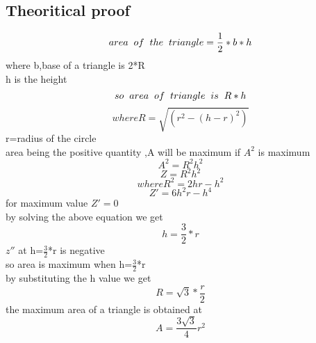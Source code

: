 \documentclass[10pt,a4paper]{report}
\begin{document}
\begin{multicols}{2}
    \section{Theoritical proof}
    \begin{equation}
	    area\hspace{2mm} of\hspace{2mm} the\hspace{2mm} triangle=\frac{1}{2}*b*h
\end{equation}
    where b,base of a triangle is 2*R\\
    h is the height\\
    \begin{equation}
    so \hspace{2mm}area \hspace{2mm}of \hspace{2mm}triangle \hspace{2mm}is \hspace{2mm}R*h
	    \end{equation}
	    \begin{equation}
where R=\sqrt{(r^2-(h-r)^2)}
\end{equation}
r=radius of the circle\\
area being the positive quantity ,A will be maximum if $A^2$ is maximum\\
\begin{equation}
A^2=R^2h^2
\end{equation}
\begin{equation}
Z=R^2h^2
\end{equation}
\begin{equation}
where R^2=2hr-h^2
\end{equation}
\begin{equation}
Z'=6h^2r-h^4
\end{equation}
for maximum value $Z'=0$\\
by solving the above equation we get\\
    \begin{equation}
	     h=\frac{3}{2}*r
    \end{equation}
    $z''$ at h=$\frac{3}{2}$*r is negative\\
    so area is maximum when h=$\frac{3}{2}$*r\\

    by substituting the h value we get\\
    \begin{equation}
	    R=\sqrt{3}*\frac{r}{2}
    \end{equation}
the maximum area of a triangle is obtained at \\
\begin{equation}
	A=\frac{3\sqrt{3}}{4}r^2
\end{equation}



\end{multicols}
\end{document}

